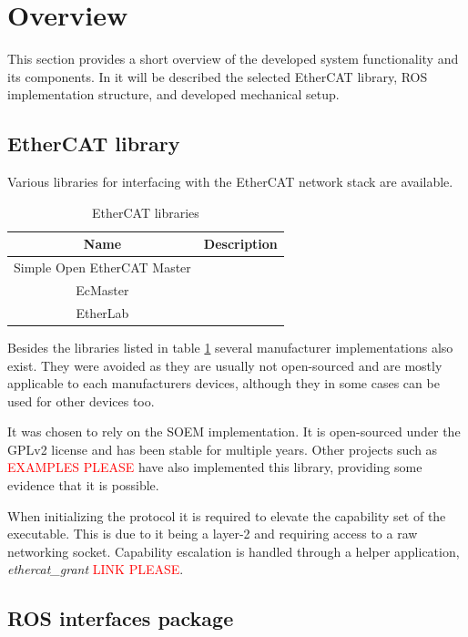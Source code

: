 \section{Overview}

This section provides a short overview of the developed system functionality and its components. In it will be described the selected EtherCAT library, ROS implementation structure, and developed mechanical setup. 

\subsection{EtherCAT library}

Various libraries for interfacing with the EtherCAT network stack are available. 

\begin{table}[H]
	\centering
	\begin{tabular}{|c|p{6cm}|}
		\hline
		\textbf{Name} & \textbf{Description} \\
		\hline
		Simple Open EtherCAT Master &  \\
		\hline
		EcMaster &  \\
		\hline
		EtherLab &  \\
		\hline
	\end{tabular}
	\caption{EtherCAT libraries}
	\label{tab:ethercat_libraries}
\end{table}

Besides the libraries listed in table \ref{tab:ethercat_libraries} several manufacturer implementations also exist.
They were avoided as they are usually not open-sourced and are mostly applicable to each manufacturers devices, although they in some cases can be used for other devices too. 

It was chosen to rely on the SOEM implementation. It is open-sourced under the GPLv2 license and has been stable for multiple years. 
Other projects such as \textcolor{red}{EXAMPLES PLEASE} have also implemented this library, providing some evidence that it is possible. 

When initializing the protocol it is required to elevate the capability set of the executable. 
This is due to it being a layer-2 and requiring access to a raw networking socket. 
Capability escalation is handled through a helper application, \textit{ethercat\_grant} \textcolor{red}{LINK PLEASE}. 

\subsection{ROS interfaces package}

